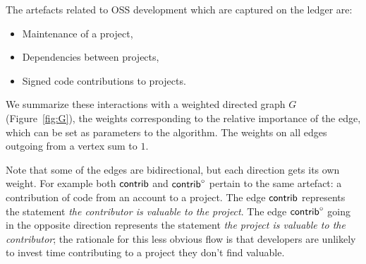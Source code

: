 The artefacts related to OSS development which are captured on the \oscoin{}
ledger are:
\begin{itemize}
  \item Maintenance of a project,
  \item Dependencies between projects,
  \item Signed code contributions to projects.
\end{itemize}
We summarize these interactions with a weighted directed graph $G$
(Figure~\ref{fig:G}), the weights corresponding to the relative importance of
the edge, which can be set as parameters to the algorithm.  The weights on all
edges outgoing from a vertex sum to $1$.

\begin{center}
\end{center}
\medskip


\noindent Note that some of the edges are bidirectional, but each direction gets
its own weight. For example both $\mathsf{contrib}$ and $\mathsf{contrib}^\circ$ pertain to
the same artefact: a contribution of code from an account to a
project. The edge $\mathsf{contrib}$ represents the statement \emph{the contributor
is valuable to the project}. The edge $\mathsf{contrib}^\circ$ going in the
opposite direction represents the statement \emph{the project is
valuable to the contributor}; the rationale for this less obvious flow is
that developers are unlikely to invest time contributing to a project they
don't find valuable.


